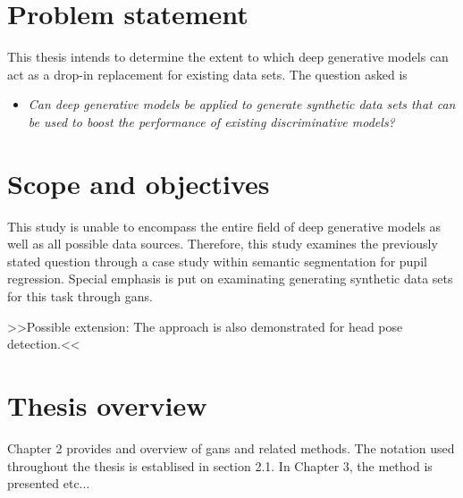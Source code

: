 \section{Problem statement}
This thesis intends to determine the extent to which deep generative models can act as a drop-in replacement for existing data sets. The question asked is

\begin{itemize}
    \item \textit{Can deep generative models be applied to generate synthetic data sets that can be used to boost the performance of existing discriminative models?}
\end{itemize}


\section{Scope and objectives}
This study is unable to encompass the entire field of deep generative models as well as all possible data sources. Therefore, this study examines the previously stated question through a case study within semantic segmentation for pupil regression. Special emphasis is put on examinating generating synthetic data sets for this task through \acrlong{gans}.

>>Possible extension: The approach is also demonstrated for head pose detection.<<

\section{Thesis overview}
Chapter 2 provides and overview of \acrlong{gans} and related methods. The notation used throughout the thesis is establised in section 2.1. In Chapter 3, the method is presented etc...



